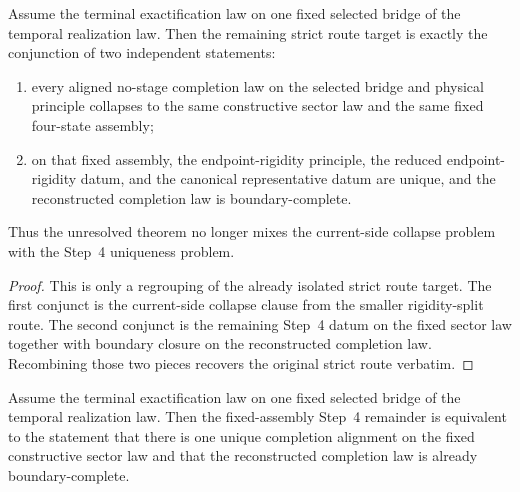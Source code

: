 \begin{theorem}
\label{thm:canonical-law-native-rigidity-boundary-route-split}
Assume the terminal exactification law on one fixed selected bridge of the
temporal realization law. Then the remaining strict route target is exactly the
conjunction of two independent statements:
\begin{enumerate}
\item every aligned no-stage completion law on the selected bridge and
physical principle collapses to the same constructive sector law and the same
fixed four-state assembly;
\item on that fixed assembly, the endpoint-rigidity principle, the reduced
endpoint-rigidity datum, and the canonical representative datum are unique,
and the reconstructed completion law is boundary-complete.
\end{enumerate}
Thus the unresolved theorem no longer mixes the current-side collapse problem
with the Step~4 uniqueness problem.
\end{theorem}

\begin{proof}
This is only a regrouping of the already isolated strict route target. The
first conjunct is the current-side collapse clause from the smaller
rigidity-split route. The second conjunct is the remaining Step~4 datum on the
fixed sector law together with boundary closure on the reconstructed
completion law. Recombining those two pieces recovers the original strict
route verbatim.
\end{proof}

\begin{theorem}
\label{thm:canonical-law-native-step4-boundary-route-target-iff-canonical-law-native-alignment-boundary-target}
Assume the terminal exactification law on one fixed selected bridge of the
temporal realization law. Then the fixed-assembly Step~4 remainder is
equivalent to the statement that there is one unique completion alignment on
the fixed constructive sector law and that the reconstructed completion law is
already boundary-complete.
\end{theorem}


